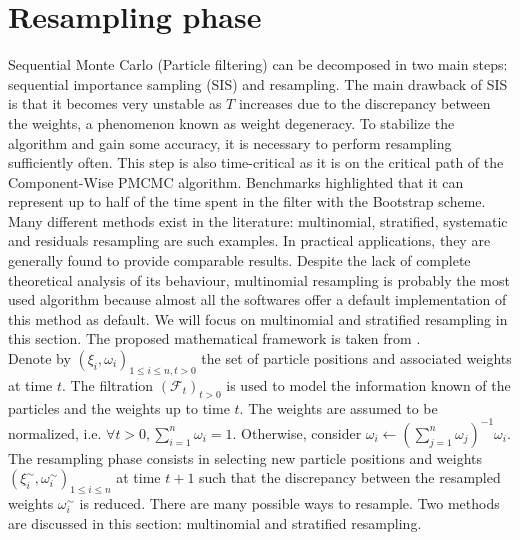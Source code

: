 \documentclass[11pt,a4,twosided,singlespacing,titlepagenumber=on]{scrreprt}
\numberwithin{equation}{chapter} %
\theoremstyle{remark}
\begin{document}
\section{Resampling phase}
Sequential Monte Carlo (Particle filtering) can be decomposed in two main steps: sequential importance sampling (SIS) and resampling. The main drawback of SIS is that it becomes very unstable as $T$ increases due to the discrepancy between the weights, a phenomenon known as weight degeneracy. To stabilize the algorithm and gain some accuracy, it is necessary to perform resampling sufficiently often. This step is also time-critical as it is on the critical path of the Component-Wise PMCMC algorithm. Benchmarks highlighted that it can represent up to half of the time spent in the filter with the Bootstrap scheme. Many different methods exist in the literature: multinomial, stratified, systematic and residuals resampling are such examples. In practical applications, they are generally found to provide comparable results. Despite the lack of complete theoretical analysis of its behaviour, multinomial resampling is probably the most used algorithm because almost all the softwares offer a default implementation of this method as default. We will focus on multinomial and stratified resampling in this section. The proposed mathematical framework is taken from \cite{douc2005}. \\


Denote by $\left( \xi_i, \omega_i \right)_{1 \leq i \leq n, t > 0}$ the set of particle positions and associated weights at time $t$. The filtration $(\mathcal{F}_t)_{t > 0}$ is used to model the information known of the particles and the weights up to time $t$. The weights are assumed to be normalized, i.e. $\forall t > 0, \sum_{i=1}^n \omega_i = 1$. Otherwise, consider $\omega_i \leftarrow \left( \sum_{j=1}^n \omega_j\right)^{-1} \omega_i$. The resampling phase consists in selecting new particle positions and weights $\left( \xi_i^\sim, \omega_i^\sim \right)_{1 \leq i \leq n}$ at time $t+1$ such that the discrepancy between the resampled weights $\omega_i^\sim$ is reduced. There are many possible ways to resample. Two methods are discussed in this section: multinomial and stratified resampling. \\
\end{document}
